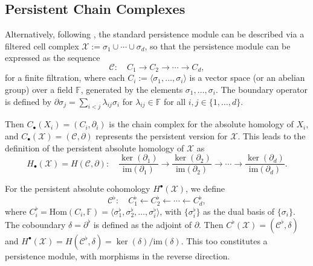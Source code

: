 \subsection{Persistent Chain Complexes}
Alternatively, following \cite[\S 2.6]{de2011dualities}, the standard persistence module
can be described via a filtered cell complex $\mathcal{X}:= \sigma_{1} \cup \cdots
\cup \sigma_{d}$, so that the persistence module can be expressed as the
sequence
\[
	\mathcal{C}: \quad C_{1} \to C_{2} \to \cdots \to C_{d},
\]
for a finite filtration, where each $C_{i} := \langle \sigma_{1}, \ldots, \sigma_{i}
\rangle$ is a vector space (or an abelian group) over a field $\mathbb{F}$,
generated by the elements $\sigma_{1}, \ldots, \sigma_{i}$. The boundary operator
is defined by $\partial \sigma_{j} = \sum_{i<j}\lambda_{ij}\sigma_{i}$ for $\lambda
_{ij}\in \mathbb{F}$ for all $i, j \in \{1, \ldots, d\}$.

Then $C_{\bullet}(X_{i}) = (C_{i},\partial_{i})$ is the chain complex for the absolute
homology of $X_{i}$, and $C_{\bullet}(\mathcal{X}) = (\mathcal{C},\partial)$
represents the persistent version for $\mathcal{X}$. This leads to the definition
of the persistent absolute homology of $\mathcal{X}$ as
\[
	H_{\bullet}(\mathcal{X}) = H(\mathcal{C}, \partial): \quad \frac{\ker(\partial_{1})}{\text{im}(\partial_{1})}
	\to \frac{\ker(\partial_{2})}{\text{im}(\partial_{2})}\to \cdots \to \frac{\ker(\partial_{d})}{\text{im}(\partial_{d})}
	.
\]

For the persistent absolute cohomology $H^{\bullet}(\mathcal{X})$, we define
\[
	\mathcal{C}^{\flat}: \quad C^{\flat}_{1} \leftarrow C^{\flat}_{2} \leftarrow \cdots
	\leftarrow C^{\flat}_{d},
\]
where $C_{i}^{\flat} = \text{Hom}(C_{i}, \mathbb{F}) = \langle \sigma_{1}^{\flat}
, \sigma_{2}^{\flat}, \ldots, \sigma_{i}^{\flat} \rangle$, with
$\{\sigma_{i}^{\flat}\}$ as the dual basis of $\{\sigma_{i}\}$. The coboundary $\delta
= \partial^{\flat}$ is defined as the adjoint of $\partial$. Then
$C^{\flat}(\mathcal{X}) = (\mathcal{C}^{\flat}, \delta)$ and
$H^{\bullet}(\mathcal{X}) = H(\mathcal{C}^{\flat}, \delta) = \ker(\delta) / \text{im}
(\delta)$. This too constitutes a persistence module, with morphisms in the
reverse direction.

